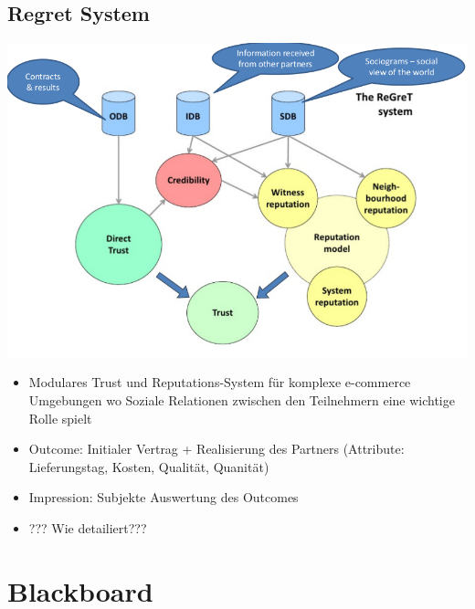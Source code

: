\documentclass{article} %
\begin{document}
	\subsection{Regret System}
	\begin{center}
		\includegraphics[scale=0.3]{img/regret.png}
	\end{center}
	\begin{itemize}
		\item Modulares Trust und Reputations-System für komplexe e-commerce Umgebungen wo Soziale Relationen zwischen den Teilnehmern eine wichtige Rolle spielt
		\item Outcome: Initialer Vertrag + Realisierung des Partners (Attribute: Lieferungstag, Kosten, Qualität, Quanität)
		\item Impression: Subjekte Auswertung des Outcomes
		\item ??? Wie detailiert???
	\end{itemize}
	\section{Blackboard}
\end{document}
